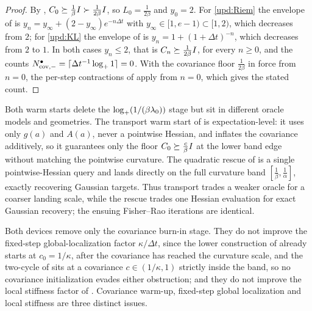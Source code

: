 \begin{proof}
    By , $C_0\succeq\tfrac1\beta I\succ\tfrac1{2\beta}I$, so
    $L_0=\tfrac1{2\beta}$ and $y_0=2$. For \eqref{upd:Riem} the envelope of
     is $y_n=y_\infty+(2-y_\infty)e^{-n\Delta t}$ with
    $y_\infty\in[1,e-1)\subset[1,2)$, which decreases from $2$; for \eqref{upd:KL} the envelope
    of  is $y_n=1+(1+\Delta t)^{-n}$, which decreases from $2$ to $1$. In both
    cases $y_n\leq2$, that is $C_n\succeq\tfrac1{2\beta}I$, for every $n\geq0$, and the
    counts $N_{\mathrm{cov},-}^\bullet=\lceil\Delta t^{-1}\log_+1\rceil=0$. With the covariance floor
    $\tfrac1{2\beta}$ in force from $n=0$, the per-step contractions of
     apply from $n=0$, which gives the stated count.
\end{proof}

Both warm starts delete the $\log_+(1/(\beta\lambda_0))$ stage but sit in different oracle
models and geometries. The transport warm start of  is
expectation-level: it uses only $g(a)$ and $A(a)$, never a pointwise Hessian, and inflates
the covariance additively, so it guarantees only the floor $C_0\succeq\tfrac c\beta I$ at
the lower band edge without matching the pointwise curvature. The quadratic rescue of
 is a single pointwise-Hessian query and lands directly on the full
curvature band $[\tfrac1\beta,\tfrac1\alpha]$, exactly recovering Gaussian targets. Thus
transport trades a weaker oracle for a coarser landing scale, while the rescue trades one
Hessian evaluation for exact Gaussian recovery; the ensuing Fisher--Rao iterations are
identical.

Both devices remove only the covariance burn-in stage. They do not improve the fixed-step
global-localization factor $\kappa/\Delta t$, since the lower construction of
 already starts at $c_0=1/\kappa$, after the covariance has reached
the curvature scale, and the two-cycle of  sits at a covariance
$c\in(1/\kappa,1)$ strictly inside the band, so no covariance initialization evades either
obstruction; and they do not improve the local stiffness factor of
. Covariance warm-up, fixed-step global localization and local stiffness
are three distinct issues.



